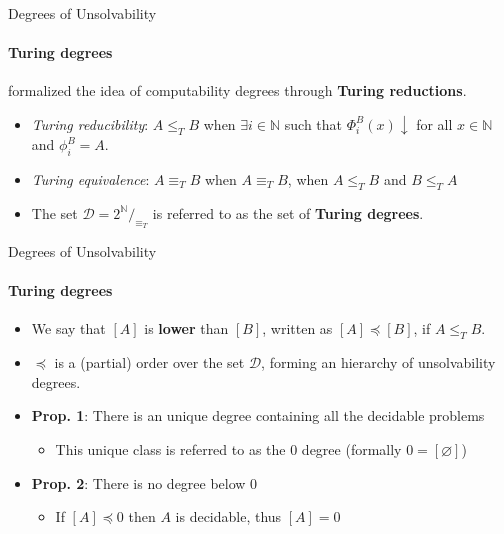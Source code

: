 \documentclass{beamer}
\newcommand{\N}{\mathbb{N}}                     %
\begin{document}
\begin{frame}{Degrees of Unsolvability}
\framesubtitle{Turing degrees}
    \textcite{post_degrees} formalized the idea of computability degrees through \textbf{Turing reductions}.

    \begin{itemize}[<+->]
        \item \textit{Turing reducibility}: $A \leq_T B$ when $\exists i \in \N$ such that $\Phi_i^B(x) \downarrow$ for all $x \in \N$ and $\phi_i^B = A$.
        \item \textit{Turing equivalence}: $A \equiv_T B$ when $A \equiv_T B$, when $A \leq_T B$ and $B \leq_T A$
        \item The set $\mathcal{D} = 2^{\N}/_{\equiv_T}$ is referred to as the set of \textbf{Turing degrees}.
    \end{itemize}
\end{frame}

\begin{frame}{Degrees of Unsolvability}
\framesubtitle{Turing degrees}

    \begin{itemize}[<+->]
        \setlength{\itemindent}{-2em}

        \item[] We say that $[A]$ is \textbf{lower} than $[B]$, written as $[A] \preceq [B]$, if $A \leq_T B$.
        
        \quad
        
        \item[] $\preceq$ is a (partial) order over the set $\mathcal{D}$, forming an hierarchy of unsolvability degrees.
        
        \quad

        \item[] \textbf{Prop. 1}: There is an unique degree containing all the decidable problems
    
        \begin{itemize}
            \item This unique class is referred to as the $0$ degree (formally $0 = [\varnothing]$)
        \end{itemize}

        \quad

        \item[ ]\textbf{Prop. 2}: There is no degree below $0$
        \begin{itemize}
            \item If $[A] \preceq 0$ then $A$ is decidable, thus $[A] = 0$
        \end{itemize}
    \end{itemize}
\end{frame}
\end{document}
